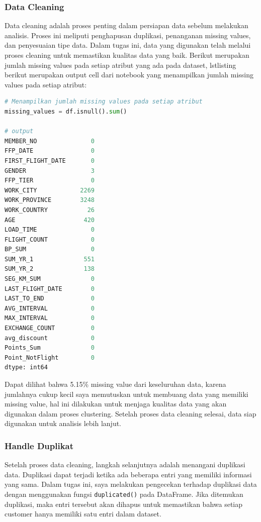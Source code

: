 \subsubsection{Data Cleaning}
Data cleaning adalah proses penting dalam persiapan data sebelum melakukan analisis. Proses ini meliputi penghapusan duplikasi, penanganan missing values, dan penyesuaian tipe data. Dalam tugas ini, data yang digunakan telah melalui proses cleaning untuk memastikan kualitas data yang baik. Berikut merupakan jumlah missing values pada setiap atribut yang ada pada dataset, lstlisting berikut merupakan output cell dari notebook yang menampilkan jumlah missing values pada setiap atribut:

\begin{lstlisting}[language=Python]
# Menampilkan jumlah missing values pada setiap atribut
missing_values = df.isnull().sum()

# output
MEMBER_NO               0
FFP_DATE                0
FIRST_FLIGHT_DATE       0
GENDER                  3
FFP_TIER                0
WORK_CITY            2269
WORK_PROVINCE        3248
WORK_COUNTRY           26
AGE                   420
LOAD_TIME               0
FLIGHT_COUNT            0
BP_SUM                  0
SUM_YR_1              551
SUM_YR_2              138
SEG_KM_SUM              0
LAST_FLIGHT_DATE        0
LAST_TO_END             0
AVG_INTERVAL            0
MAX_INTERVAL            0
EXCHANGE_COUNT          0
avg_discount            0
Points_Sum              0
Point_NotFlight         0
dtype: int64
\end{lstlisting}

Dapat dilihat bahwa 5.15\% missing value dari keseluruhan data, karena jumlahnya cukup kecil saya memutuskan untuk membuang data yang memiliki missing value, hal ini dilakukan untuk menjaga kualitas data yang akan digunakan dalam proses clustering. Setelah proses data cleaning selesai, data siap digunakan untuk analisis lebih lanjut.

\subsubsection{Handle Duplikat}
Setelah proses data cleaning, langkah selanjutnya adalah menangani duplikasi data. Duplikasi dapat terjadi ketika ada beberapa entri yang memiliki informasi yang sama. Dalam tugas ini, saya melakukan pengecekan terhadap duplikasi data dengan menggunakan fungsi \texttt{duplicated()} pada DataFrame. Jika ditemukan duplikasi, maka entri tersebut akan dihapus untuk memastikan bahwa setiap customer hanya memiliki satu entri dalam dataset.

